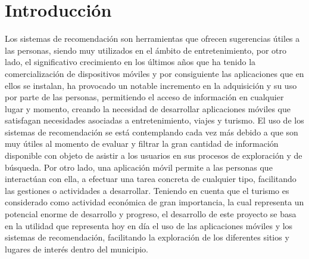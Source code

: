 \documentclass[12pt,letterpaper,openany]{book}
\begin{document}
\chapter{Introducción}\label{cap.introduccion}
Los sistemas de recomendación son herramientas que ofrecen sugerencias útiles a las personas, siendo muy utilizados en el ámbito de entretenimiento, por otro lado, el significativo crecimiento en los últimos años que ha tenido la comercialización de dispositivos móviles y por consiguiente las aplicaciones que en ellos se instalan, ha provocado un notable incremento en la adquisición y su uso por parte de las personas, permitiendo el acceso de información en cualquier lugar y momento, creando la necesidad de desarrollar aplicaciones móviles que satisfagan necesidades asociadas a entretenimiento, viajes y turismo.
\vspace{5mm}\newline
El uso de los sistemas de recomendación se está contemplando cada vez más debido a que son muy útiles al momento de evaluar y filtrar la gran cantidad de información disponible con objeto de asistir a los usuarios en sus procesos de exploración y de búsqueda\cite{1}. Por otro lado, una aplicación móvil permite a las personas que interactúan con ella, a efectuar una tarea concreta de cualquier tipo, facilitando las gestiones o actividades a desarrollar\cite{2}.
\vspace{5mm}\newline
Teniendo en cuenta que el turismo es considerado como actividad económica de gran importancia, la cual representa un potencial enorme de desarrollo y progreso, el desarrollo de este proyecto se basa en la utilidad que representa hoy en día el uso de las aplicaciones móviles y los sistemas de recomendación, facilitando la exploración de los diferentes sitios y lugares de interés dentro del municipio.
\end{document}
